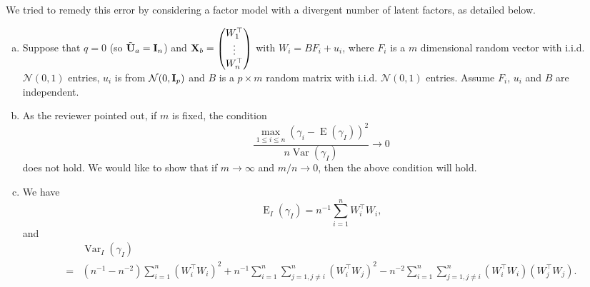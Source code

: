 \documentclass[11pt]{article}
\DeclareMathOperator{\myE}{E}
\DeclareMathOperator{\myVar}{Var}
\theoremstyle{plain}
\theoremstyle{definition}
\theoremstyle{remark}
\begin{document}
We tried to remedy this error by considering a factor model with a divergent number of latent factors, as detailed below.
    \begin{enumerate}[(a)]
        \item 
            Suppose that $q=0$ (so $\tilde {\mathbf{U}}_a = \mathbf{I}_n$) and $\mathbf{X}_b= \begin{pmatrix} W_1^\top \\ \vdots \\ W_n^\top \end{pmatrix}$ with $W_i = B F_i + u_i$, where $F_i$ is a $m$ dimensional random vector with i.i.d. $\mathcal N(0,1)$ entries, $u_i$ is from $\mathcal N(0, \mathbf{I}_p)$ and $B$ is a $p \times m$ random matrix with i.i.d. $\mathcal N (0, 1)$ entries.
            Assume $F_i$, $u_i$ and $B$ are independent.
        \item
            As the reviewer pointed out, if $m$ is fixed, the condition 
            \begin{equation*}
                \frac{\max_{1\leq i \leq n }(\gamma_i -\myE(\gamma_I))^2}{n\myVar(\gamma_I)} \to 0 
            \end{equation*}
            does not hold.
            We would like to show that if $m \to \infty$ and $m / n \to 0$, then the above condition will hold.
        \item
        We have
        \begin{equation*}
            \myE_I(\gamma_I)  = n^{-1} \sum_{i=1}^n W_i^\top W_i,
        \end{equation*}
        and 
        \begin{align*}
            &\myVar_I(\gamma_I)  
            \\
            =& (n^{-1} - n^{-2} )\sum_{i=1}^n (W_i^\top W_i)^2 + n^{-1} \sum_{i=1}^n \sum_{j=1,j\neq i}^n (W_i^\top W_j)^2- n^{-2}\sum_{i=1}^n \sum_{j=1,j\neq i}^n (W_i^\top W_i)(W_j^\top W_j).
        \end{align*}


\end{enumerate}
\end{document}
